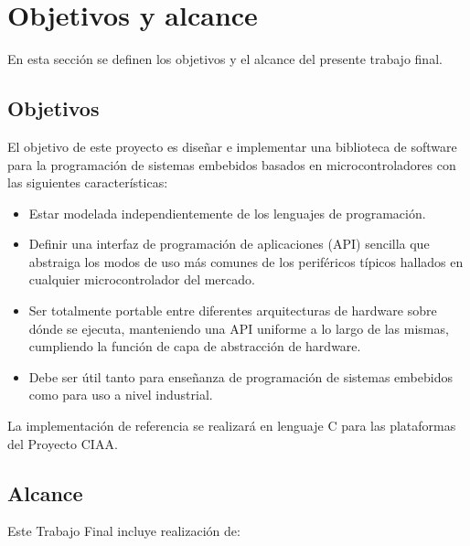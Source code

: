\section{Objetivos y alcance}
\label{sec:objetivosAlance}

En esta sección se definen los objetivos y el alcance del presente trabajo final.

\subsection{Objetivos}
\label{subsec:objetivos}

El objetivo de este proyecto es diseñar e implementar una biblioteca de software para la programación de sistemas embebidos basados en microcontroladores con las siguientes características: 

\begin{itemize}
\item
Estar modelada independientemente de los lenguajes de programación.
\item
Definir una interfaz de programación de aplicaciones (API) sencilla que abstraiga los modos de uso más comunes de los periféricos típicos hallados en cualquier microcontrolador del mercado. 
\item
Ser totalmente portable entre diferentes arquitecturas de hardware sobre dónde se ejecuta, manteniendo una API uniforme a lo largo de las mismas, cumpliendo la función de capa de abstracción de hardware.
\item
Debe ser útil tanto para enseñanza de programación de sistemas embebidos como para uso a nivel industrial.
\end{itemize}

La implementación de referencia se realizará en lenguaje C para las plataformas del Proyecto CIAA.

\subsection{Alcance}
\label{subsec:alcance}

Este Trabajo Final incluye realización de:

